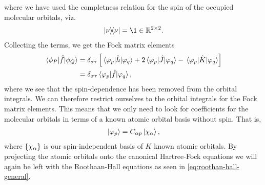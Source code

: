             where we have used the completness relation for the spin of the
            occupied molecular orbitals, viz.
            \begin{align}
                \dyad*{\nu}
                = \1 \in \mathbb{R}^{2 \times 2}.
            \end{align}
            Collecting the terms, we get the Fock matrix elements
            \begin{align}
                \mel*{\phi_P}{\hat{f}}{\phi_Q}
                &=
                \delta_{\sigma\tau}
                \left[ 
                    \mel*{\varphi_p}{\hat{h}}{\varphi_q}
                    +
                    2
                    \mel*{\varphi_p}{\hat{J}}{\varphi_q}
                    -
                    \mel*{\varphi_p}{\hat{K}}{\varphi_q}
                 \right]
                \\
                &=
                \delta_{\sigma\tau}
                \mel*{\varphi_p}{\hat{f}}{\varphi_q},
            \end{align}
            where we see that the spin-dependence has been removed from the
            orbital integrals.
            We can therefore restrict ourselves to the orbital integrals for the
            Fock matrix elements.
            This means that we only need to look for coefficients for the
            molecular orbitals in terms of a known atomic orbital basis without
            spin.
            That is,
            \begin{align}
                \ket*{\varphi_p} = C_{\alpha p} \ket*{\chi_{\alpha}},
            \end{align}
            where $\left\{ \chi_{\alpha} \right\}$ is our spin-independent basis of $K$
            known atomic orbitals.
            By projecting the atomic orbitals onto the canonical Hartree-Fock
            equations we will again be left with the Roothaan-Hall equations as
            seen in \autoref{eq:roothan-hall-general}.

